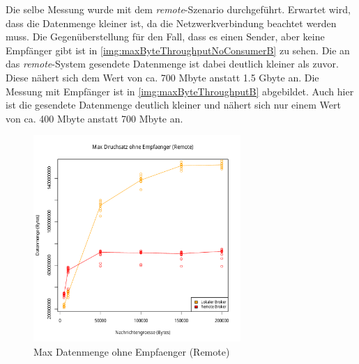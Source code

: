 
Die selbe Messung wurde mit dem \textit{remote}-Szenario durchgeführt. Erwartet wird, dass die Datenmenge kleiner ist, da die Netzwerkverbindung beachtet werden muss. 
Die Gegenüberstellung für den Fall, dass es einen Sender, aber keine Empfänger gibt ist in \autoref{img:maxByteThroughputNoConsumerB} zu sehen. Die an das \textit{remote}-System gesendete Datenmenge ist dabei deutlich kleiner als zuvor. Diese nähert sich dem Wert von ca. 700 Mbyte anstatt 1.5 Gbyte an. Die Messung mit Empfänger ist in \autoref{img:maxByteThroughputB} abgebildet. Auch hier ist die gesendete Datenmenge deutlich kleiner und nähert sich nur einem Wert von ca. 400 Mbyte anstatt 700 Mbyte an.
\begin{figure}
\center
 \includegraphics[width=0.7\textwidth]{images/measurement/rate-limit-unlimited-no-consumer-AvsB.pdf}
  \caption{Max Datenmenge ohne Empfaenger (Remote)}
  \label{img:maxByteThroughputNoConsumerB}
\end{figure}
